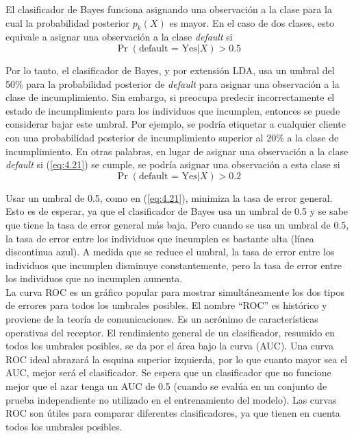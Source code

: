 El clasificador de Bayes funciona asignando una observación a la clase para la cual la probabilidad posterior $p_k(X)$ es mayor. En el caso de dos clases, esto equivale a asignar una observación a la clase \textit{default} si
\begin{equation}
\Pr(\text{default = Yes} | X) > 0.5
\label{eq:4.21}
\end{equation}

Por lo tanto, el clasificador de Bayes, y por extensión LDA, usa un umbral del 50\% para la probabilidad posterior de \textit{default} para asignar una observación a la clase de incumplimiento. Sin embargo, si preocupa predecir incorrectamente el estado de incumplimiento para los individuos que incumplen, entonces se puede considerar bajar este umbral. Por ejemplo, se podría etiquetar a cualquier cliente con una probabilidad posterior de incumplimiento superior al 20\% a la clase de incumplimiento. En otras palabras, en lugar de asignar una observación a la clase \textit{default} si (\ref{eq:4.21}) se cumple, se podría asignar una observación a esta clase si
\begin{equation}
\Pr(\text{default = Yes} | X) > 0.2
\label{eq:4.22}
\end{equation}

Usar un umbral de 0.5, como en (\ref{eq:4.21}), minimiza la tasa de error general. Esto es de esperar, ya que el clasificador de Bayes usa un umbral de 0.5 y se sabe que tiene la tasa de error general más baja. Pero cuando se usa un umbral de 0.5, la tasa de error entre los individuos que incumplen es bastante alta (línea discontinua azul). A medida que se reduce el umbral, la tasa de error entre los individuos que incumplen disminuye constantemente, pero la tasa de error entre los individuos que no incumplen aumenta. \\

La curva ROC es un gráfico popular para mostrar simultáneamente los dos tipos de errores para todos los umbrales posibles. El nombre ``ROC'' es histórico y proviene de la teoría de comunicaciones. Es un acrónimo de características operativas del receptor. El rendimiento general de un clasificador, resumido en todos los umbrales posibles, se da por el área bajo la curva (AUC). Una curva ROC ideal abrazará la esquina superior izquierda, por lo que cuanto mayor sea el AUC, mejor será el clasificador. Se espera que un clasificador que no funcione mejor que el azar tenga un AUC de 0.5 (cuando se evalúa en un conjunto de prueba independiente no utilizado en el entrenamiento del modelo). Las curvas ROC son útiles para comparar diferentes clasificadores, ya que tienen en cuenta todos los umbrales posibles. \\

